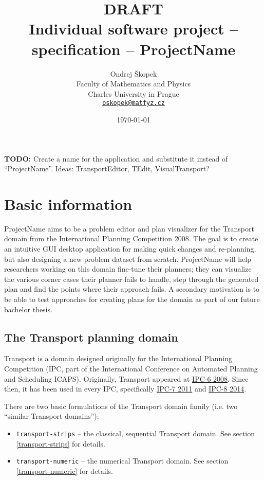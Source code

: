 \documentclass[10pt,a4paper,oneside]{article}
\author{Ondrej Škopek\\
Faculty of Mathematics and Physics\\
Charles University in Prague\\
\texttt{\href{mailto:oskopek@matfyz.cz}{oskopek@matfyz.cz}}}
\title{\textbf{DRAFT}\\Individual software project -- specification -- ProjectName}
\date{\today}
\newcommand{\TODO}[1]{{\textbf{TODO:} #1}} %
\newcommand{\pname}{ProjectName} %
\begin{document}
\maketitle

\TODO Create a name for the application and substitute it instead of ``\pname{}''. Ideas: TransportEditor, TEdit, VisualTransport?











\section{Basic information}

\pname{} aims to be a problem editor and plan visualizer for the Transport domain from the International Planning Competition 2008.
The goal is to create an intuitive GUI desktop application for making quick changes and re-planning, but also designing a new problem dataset from scratch. \pname{} will help researchers working on this domain fine-tune their planners; they can visualize the various corner cases their planner fails to handle, step through the generated plan and find the points where their approach fails.
A secondary motivation is to be able to test approaches for creating plans for the domain as part of our future bachelor thesis.

\subsection{The Transport planning domain}

Transport is a domain designed originally for the International Planning Competition (IPC, part of the International Conference on Automated Planning and Scheduling ICAPS).
Originally, Transport appeared at \href{http://icaps-conference.org/ipc2008/deterministic/Domains.html}{IPC-6 2008}.
Since then, it has been used in every IPC, specifically \href{http://www.plg.inf.uc3m.es/ipc2011-deterministic/}{IPC-7 2011}
and \href{https://helios.hud.ac.uk/scommv/IPC-14/}{IPC-8 2014}.

There are two basic formulations of the Transport domain family (i.e. two ``similar Transport domains''):
\begin{itemize}
\item \verb+transport-strips+ -- the classical, sequential Transport domain. See section \ref{transport-strips} for details.
\item \verb+transport-numeric+ -- the numerical Transport domain. See section \ref{transport-numeric} for details.
\end{itemize}
\end{document}
